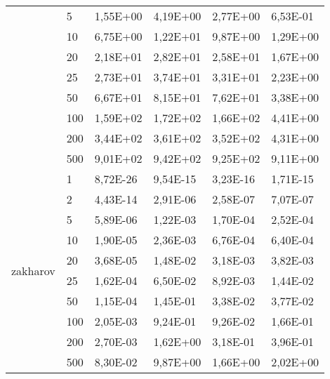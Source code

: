 \begin{longtable}[c]{|m{3.5cm}|l|l|l|l|l|}
                                        & 5         & 1,55E+00   & 4,19E+00   & 2,77E+00   & 6,53E-01  \\ \cline{2-6} 
                                        & 10        & 6,75E+00   & 1,22E+01   & 9,87E+00   & 1,29E+00  \\ \cline{2-6} 
                                        & 20        & 2,18E+01   & 2,82E+01   & 2,58E+01   & 1,67E+00  \\ \cline{2-6} 
                                        & 25        & 2,73E+01   & 3,74E+01   & 3,31E+01   & 2,23E+00  \\ \cline{2-6} 
                                        & 50        & 6,67E+01   & 8,15E+01   & 7,62E+01   & 3,38E+00  \\ \cline{2-6} 
                                        & 100       & 1,59E+02   & 1,72E+02   & 1,66E+02   & 4,41E+00  \\ \cline{2-6} 
                                        & 200       & 3,44E+02   & 3,61E+02   & 3,52E+02   & 4,31E+00  \\ \cline{2-6} 
                                        & 500       & 9,01E+02   & 9,42E+02   & 9,25E+02   & 9,11E+00  \\ \hline
\multirow{10}{*}{zakharov}              & 1         & 8,72E-26   & 9,54E-15   & 3,23E-16   & 1,71E-15  \\ \cline{2-6} 
                                        & 2         & 4,43E-14   & 2,91E-06   & 2,58E-07   & 7,07E-07  \\ \cline{2-6} 
                                        & 5         & 5,89E-06   & 1,22E-03   & 1,70E-04   & 2,52E-04  \\ \cline{2-6} 
                                        & 10        & 1,90E-05   & 2,36E-03   & 6,76E-04   & 6,40E-04  \\ \cline{2-6} 
                                        & 20        & 3,68E-05   & 1,48E-02   & 3,18E-03   & 3,82E-03  \\ \cline{2-6} 
                                        & 25        & 1,62E-04   & 6,50E-02   & 8,92E-03   & 1,44E-02  \\ \cline{2-6} 
                                        & 50        & 1,15E-04   & 1,45E-01   & 3,38E-02   & 3,77E-02  \\ \cline{2-6} 
                                        & 100       & 2,05E-03   & 9,24E-01   & 9,26E-02   & 1,66E-01  \\ \cline{2-6} 
                                        & 200       & 2,70E-03   & 1,62E+00   & 3,18E-01   & 3,96E-01  \\ \cline{2-6} 
                                        & 500       & 8,30E-02   & 9,87E+00   & 1,66E+00   & 2,02E+00  \\ \hline
\end{longtable}

